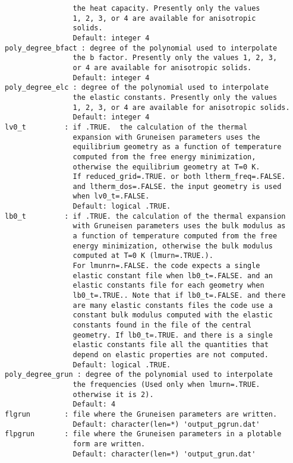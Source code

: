 \documentclass[12pt,a4paper,twoside]{report}
\begin{document}
\begin{verbatim}
                the heat capacity. Presently only the values 
                1, 2, 3, or 4 are available for anisotropic 
                solids.
                Default: integer 4
poly_degree_bfact : degree of the polynomial used to interpolate 
                the b factor. Presently only the values 1, 2, 3, 
                or 4 are available for anisotropic solids.
                Default: integer 4
poly_degree_elc : degree of the polynomial used to interpolate 
                the elastic constants. Presently only the values 
                1, 2, 3, or 4 are available for anisotropic solids.
                Default: integer 4
lv0_t         : if .TRUE.  the calculation of the thermal 
                expansion with Gruneisen parameters uses the 
                equilibrium geometry as a function of temperature 
                computed from the free energy minimization, 
                otherwise the equilibrium geometry at T=0 K. 
                If reduced_grid=.TRUE. or both ltherm_freq=.FALSE. 
                and ltherm_dos=.FALSE. the input geometry is used 
                when lv0_t=.FALSE.
                Default: logical .TRUE.
lb0_t         : if .TRUE. the calculation of the thermal expansion 
                with Gruneisen parameters uses the bulk modulus as 
                a function of temperature computed from the free 
                energy minimization, otherwise the bulk modulus 
                computed at T=0 K (lmurn=.TRUE.). 
                For lmunrn=.FALSE. the code expects a single 
                elastic constant file when lb0_t=.FALSE. and an 
                elastic constants file for each geometry when 
                lb0_t=.TRUE.. Note that if lb0_t=.FALSE. and there 
                are many elastic constants files the code use a 
                constant bulk modulus computed with the elastic 
                constants found in the file of the central 
                geometry. If lb0_t=.TRUE. and there is a single 
                elastic constants file all the quantities that 
                depend on elastic properties are not computed.
                Default: logical .TRUE.
poly_degree_grun : degree of the polynomial used to interpolate 
                the frequencies (Used only when lmurn=.TRUE. 
                otherwise it is 2).
                Default: 4
flgrun        : file where the Gruneisen parameters are written. 
                Default: character(len=*) 'output_pgrun.dat'
flpgrun       : file where the Gruneisen parameters in a plotable 
                form are written.
                Default: character(len=*) 'output_grun.dat'

\end{verbatim}
\end{document}
